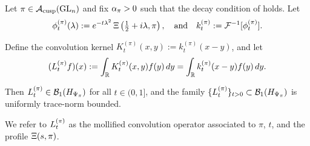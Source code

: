 \begin{definition}
\label{def:convolution_operator_Ltpi}
Let \( \pi \in \mathcal{A}_{\mathrm{cusp}}(\mathrm{GL}_n) \) and fix \( \alpha_{\pi} > 0 \) such that the decay condition of  holds. Let
\[
\phi_t^{(\pi)}(\lambda) := e^{-t\lambda^2} \, \Xi\left(\tfrac{1}{2} + i\lambda, \pi\right),
\quad \text{and} \quad
k_t^{(\pi)} := \mathcal{F}^{-1}[\phi_t^{(\pi)}].
\]

Define the convolution kernel \( K_t^{(\pi)}(x, y) := k_t^{(\pi)}(x - y) \), and let
\[
(L_t^{(\pi)} f)(x) := \int_{\mathbb{R}} K_t^{(\pi)}(x, y) f(y) \, dy = \int_{\mathbb{R}} k_t^{(\pi)}(x - y) f(y) \, dy.
\]

Then \( L_t^{(\pi)} \in \mathcal{B}_1(H_{\Psi_{\pi}}) \) for all \( t \in (0, 1] \), and the family \( \{ L_t^{(\pi)} \}_{t > 0} \subset \mathcal{B}_1(H_{\Psi_{\pi}}) \) is uniformly trace-norm bounded.

We refer to \( L_t^{(\pi)} \) as the mollified convolution operator associated to \( \pi \), \( t \), and the profile \( \Xi(s, \pi) \).
\end{definition}
